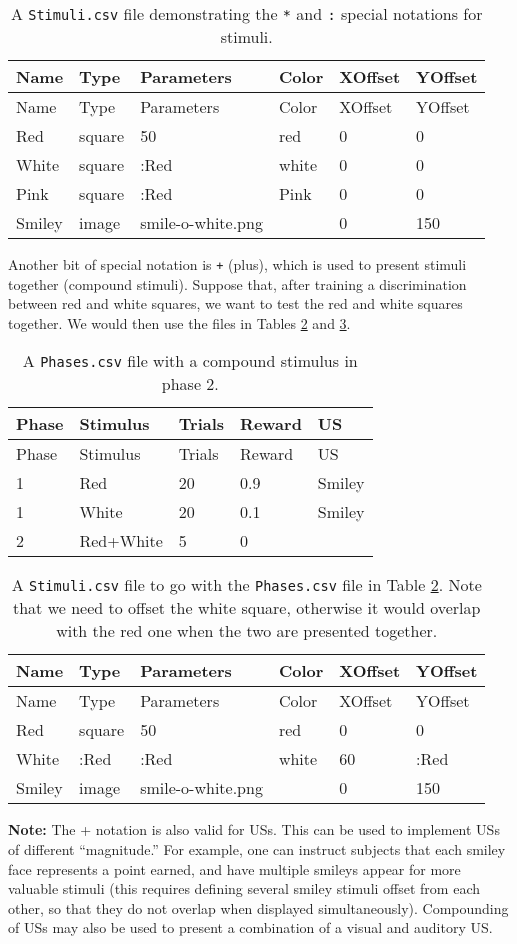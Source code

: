 \documentclass[11pt,]{article}
\begin{document}
\begin{longtable}[c]{@{}llllll@{}}
\caption{A \texttt{Stimuli.csv} file demonstrating the \texttt{*} and
\texttt{:} special notations for stimuli.
\label{stimuli-special}}\tabularnewline
\toprule
Name & Type & Parameters & Color & XOffset & YOffset\tabularnewline
\midrule
\endfirsthead
\toprule
Name & Type & Parameters & Color & XOffset & YOffset\tabularnewline
\midrule
\endhead
Red & square & 50 & red & 0 & 0\tabularnewline
White & square & :Red & white & 0 & 0\tabularnewline
Pink & square & :Red & Pink & 0 & 0\tabularnewline
Smiley & image & smile-o-white.png & & 0 & 150\tabularnewline
\bottomrule
\end{longtable}

Another bit of special notation is \texttt{+} (plus), which is used to
present stimuli together (compound stimuli). Suppose that, after
training a discrimination between red and white squares, we want to test
the red and white squares together. We would then use the files in
Tables \ref{phases-plus} and \ref{stimuli-plus}.

\begin{longtable}[c]{@{}lllll@{}}
\caption{A \texttt{Phases.csv} file with a compound stimulus in phase 2.
\label{phases-plus}}\tabularnewline
\toprule
Phase & Stimulus & Trials & Reward & US\tabularnewline
\midrule
\endfirsthead
\toprule
Phase & Stimulus & Trials & Reward & US\tabularnewline
\midrule
\endhead
1 & Red & 20 & 0.9 & Smiley\tabularnewline
1 & White & 20 & 0.1 & Smiley\tabularnewline
2 & Red+White & 5 & 0 &\tabularnewline
\bottomrule
\end{longtable}

\begin{longtable}[c]{@{}llllll@{}}
\caption{A \texttt{Stimuli.csv} file to go with the \texttt{Phases.csv}
file in Table \ref{phases-plus}. Note that we need to offset the white
square, otherwise it would overlap with the red one when the two are
presented together. \label{stimuli-plus}}\tabularnewline
\toprule
Name & Type & Parameters & Color & XOffset & YOffset\tabularnewline
\midrule
\endfirsthead
\toprule
Name & Type & Parameters & Color & XOffset & YOffset\tabularnewline
\midrule
\endhead
Red & square & 50 & red & 0 & 0\tabularnewline
White & :Red & :Red & white & 60 & :Red\tabularnewline
Smiley & image & smile-o-white.png & & 0 & 150\tabularnewline
\bottomrule
\end{longtable}

\textbf{Note:} The + notation is also valid for USs. This can be used to
implement USs of different ``magnitude.'' For example, one can instruct
subjects that each smiley face represents a point earned, and have
multiple smileys appear for more valuable stimuli (this requires
defining several smiley stimuli offset from each other, so that they do
not overlap when displayed simultaneously). Compounding of USs may also
be used to present a combination of a visual and auditory US.
\end{document}
